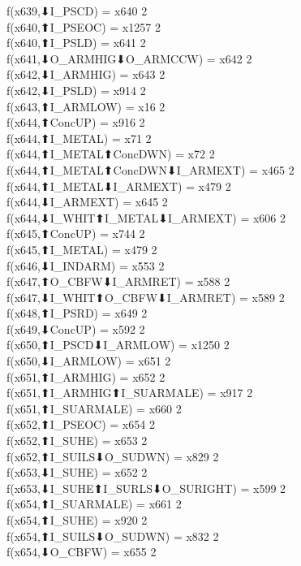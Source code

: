 f(x639,⬇I_PSCD) = x640 {2} \\
f(x640,⬆I_PSEOC) = x1257 {2} \\
f(x640,⬆I_PSLD) = x641 {2} \\
f(x641,⬇O_ARMHIG⬇O_ARMCCW) = x642 {2} \\
f(x642,⬇I_ARMHIG) = x643 {2} \\
f(x642,⬇I_PSLD) = x914 {2} \\
f(x643,⬆I_ARMLOW) = x16 {2} \\
f(x644,⬆ConcUP) = x916 {2} \\
f(x644,⬆I_METAL) = x71 {2} \\
f(x644,⬆I_METAL⬆ConcDWN) = x72 {2} \\
f(x644,⬆I_METAL⬆ConcDWN⬇I_ARMEXT) = x465 {2} \\
f(x644,⬆I_METAL⬇I_ARMEXT) = x479 {2} \\
f(x644,⬇I_ARMEXT) = x645 {2} \\
f(x644,⬇I_WHIT⬆I_METAL⬇I_ARMEXT) = x606 {2} \\
f(x645,⬆ConcUP) = x744 {2} \\
f(x645,⬆I_METAL) = x479 {2} \\
f(x646,⬇I_INDARM) = x553 {2} \\
f(x647,⬆O_CBFW⬇I_ARMRET) = x588 {2} \\
f(x647,⬇I_WHIT⬆O_CBFW⬇I_ARMRET) = x589 {2} \\
f(x648,⬆I_PSRD) = x649 {2} \\
f(x649,⬇ConcUP) = x592 {2} \\
f(x650,⬆I_PSCD⬇I_ARMLOW) = x1250 {2} \\
f(x650,⬇I_ARMLOW) = x651 {2} \\
f(x651,⬆I_ARMHIG) = x652 {2} \\
f(x651,⬆I_ARMHIG⬆I_SUARMALE) = x917 {2} \\
f(x651,⬆I_SUARMALE) = x660 {2} \\
f(x652,⬆I_PSEOC) = x654 {2} \\
f(x652,⬆I_SUHE) = x653 {2} \\
f(x652,⬆I_SUILS⬇O_SUDWN) = x829 {2} \\
f(x653,⬇I_SUHE) = x652 {2} \\
f(x653,⬇I_SUHE⬆I_SURLS⬇O_SURIGHT) = x599 {2} \\
f(x654,⬆I_SUARMALE) = x661 {2} \\
f(x654,⬆I_SUHE) = x920 {2} \\
f(x654,⬆I_SUILS⬇O_SUDWN) = x832 {2} \\
f(x654,⬇O_CBFW) = x655 {2} \\
